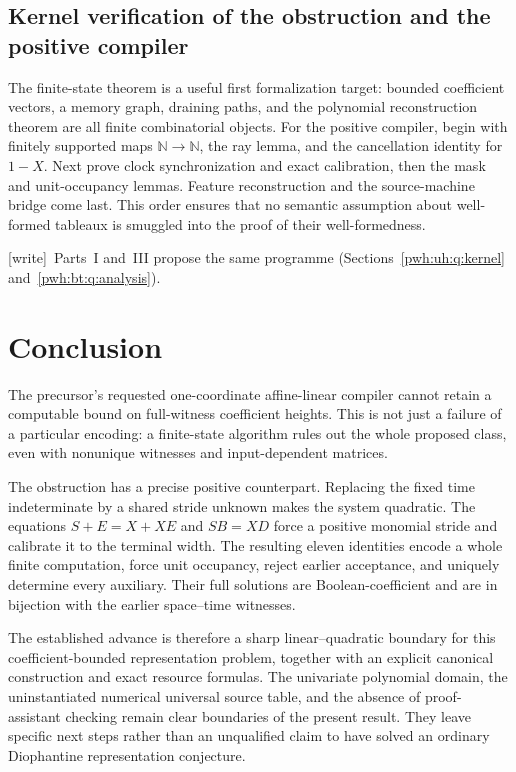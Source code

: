 \documentclass[11pt,letterpaper]{article}
\numberwithin{equation}{section}
\theoremstyle{definition}
\newcommand{\N}{\mathbb N}
\newcommand{\wtag}{\textup{[write]}}
\begin{document}
\subsection{Kernel verification of the obstruction and the positive compiler}\label{pwh:oc:q:kernel}

The finite-state theorem is a useful first formalization target: bounded
coefficient vectors, a memory graph, draining paths, and the polynomial
reconstruction theorem are all finite combinatorial objects. For the
positive compiler, begin with finitely supported maps $\N\to\N$,
the ray lemma, and the cancellation identity for $1-X$. Next prove
clock synchronization and exact calibration, then the mask and
unit-occupancy lemmas. Feature reconstruction and the source-machine
bridge come last. This order ensures that no semantic assumption about
well-formed tableaux is smuggled into the proof of their well-formedness.

\wtag\ Parts~I and~III propose the same programme
(Sections~\ref{pwh:uh:q:kernel} and~\ref{pwh:bt:q:analysis}).

\section{Conclusion}

The precursor's requested one-coordinate affine-linear compiler cannot
retain a computable bound on full-witness coefficient heights. This is
not just a failure of a particular encoding: a finite-state algorithm
rules out the whole proposed class, even with nonunique witnesses and
input-dependent matrices.

The obstruction has a precise positive counterpart. Replacing the fixed
time indeterminate by a shared stride unknown makes the system quadratic.
The equations $S+E=X+XE$ and $SB=XD$ force a positive monomial stride
and calibrate it to the terminal width. The resulting eleven identities
encode a whole finite computation, force unit occupancy, reject earlier
acceptance, and uniquely determine every auxiliary. Their full solutions
are Boolean-coefficient and are in bijection with the earlier
space--time witnesses.

The established advance is therefore a sharp linear--quadratic boundary
for this coefficient-bounded representation problem, together with an
explicit canonical construction and exact resource formulas. The
univariate polynomial domain, the uninstantiated numerical universal
source table, and the absence of proof-assistant checking remain clear
boundaries of the present result. They leave specific next steps rather
than an unqualified claim to have solved an ordinary Diophantine
representation conjecture.
\end{document}
